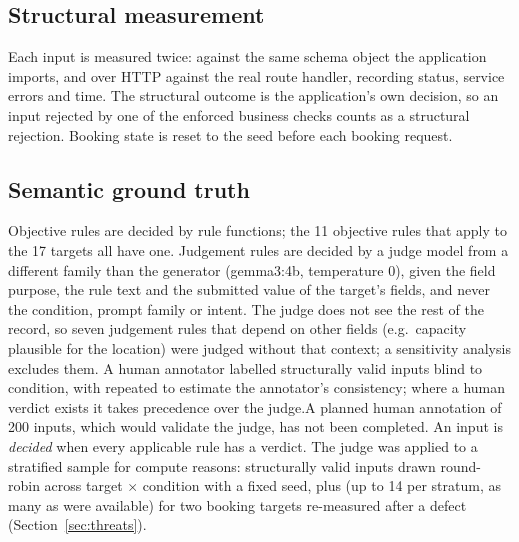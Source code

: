 \documentclass[conference]{IEEEtran}
\begin{document}
\subsection{Structural measurement}
Each input is measured twice: against the same schema object the application imports, and over HTTP
against the real route handler, recording status, service errors and time. The structural outcome is
the application's own decision, so an input rejected by one of the enforced business checks counts as
a structural rejection. Booking state is reset to the seed before each booking request.

\subsection{Semantic ground truth}
Objective rules are decided by rule functions; the 11 objective rules that apply to the 17 targets all
have one. Judgement rules are decided by a judge model from a different family than the generator
(gemma3:4b, temperature 0), given the field purpose, the rule text and the submitted value of the
target's fields, and never the condition, prompt family or intent. The judge does not see the rest of
the record, so seven judgement rules that depend on other fields (e.g.\ capacity plausible for the
location) were judged without that context; a sensitivity analysis excludes them. \ifhumanlabels
A human annotator labelled  structurally valid inputs blind to condition, with
 repeated to estimate the annotator's consistency; where a human verdict exists it takes
precedence over the judge.\else A planned human annotation of 200 inputs, which would validate the
judge, has not been completed.\fi{} An input is
\emph{decided} when every applicable rule has a verdict. The judge was applied to a stratified sample
for compute reasons:  structurally valid inputs drawn round-robin across target
$\times$ condition with a fixed seed, plus  (up to 14 per stratum, as many as were
available) for two booking targets re-measured after a defect
(Section~\ref{sec:threats}).
\end{document}
